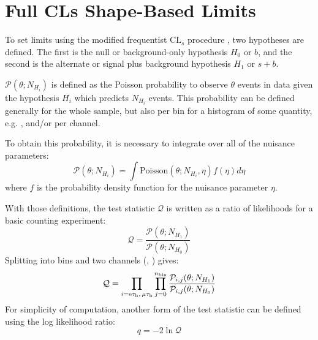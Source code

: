 \chapter{Full CLs Shape-Based Limits
\label{ch:limits}}

To set limits using the modified frequentist $\text{CL}_{s}$ procedure \cite{Read:CLs}, two hypotheses are defined. The first is the null or background-only hypothesis $H_{0}$ or $b$, and the second is the alternate or signal plus background hypothesis $H_{1}$ or $s+b$.

$\mathcal{P}(\theta; N_{H_{i}})$ is defined as the Poisson probability to observe $\theta$ events in data given the hypothesis $H_{i}$ which predicts $N_{H_{i}}$ events. This probability can be defined generally for the whole sample, but also per bin for a histogram of some quantity, e.g. \ST, and/or per channel.

To obtain this probability, it is necessary to integrate over all of the nuisance parameters:
\begin{equation}
\mathcal{P}(\theta; N_{H_{i}}) = \int \mbox{Poisson}(\theta; N_{H_{i}},\eta)f(\eta)d\eta
\end{equation}
where $f$ is the probability density function for the nuisance parameter $\eta$.

With those definitions, the test statistic $\mathcal{Q}$ is written as a ratio of likelihoods for a basic counting experiment:
\begin{equation}
\mathcal{Q} = \frac{\mathcal{P}(\theta; N_{H_{1}})}{\mathcal{P}(\theta; N_{H_{0}})}
\end{equation}
Splitting into \ST bins and two channels (\etau, \mutau) gives:
\begin{equation}
\mathcal{Q} = \prod_{i=\mathrm{e}\tau_{\text{h}},\,\mu\tau_{\text{h}}}\prod_{j=0}^{n_{\text{bin}}} \frac{\mathcal{P}_{i,j}(\theta; N_{H_{1}})}{\mathcal{P}_{i,j}(\theta; N_{H_{0}})}
\end{equation}
For simplicity of computation, another form of the test statistic can be defined using the log likelihood ratio:
\begin{equation}
q = -2 \ln \mathcal{Q}
\end{equation}

